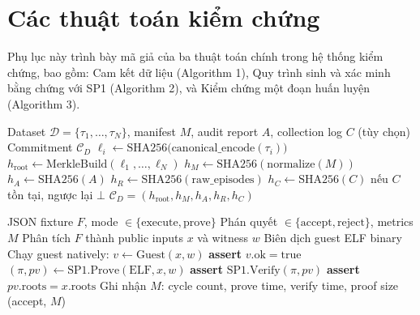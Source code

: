 \documentclass[12pt,a4paper,oneside]{report}
\begin{document}
\chapter{Các thuật toán kiểm chứng}

Phụ lục này trình bày mã giả của ba thuật toán chính trong hệ thống kiểm chứng, bao gồm: Cam kết dữ liệu (Algorithm 1), Quy trình sinh và xác minh bằng chứng với SP1 (Algorithm 2), và Kiểm chứng một đoạn huấn luyện (Algorithm 3).

\begin{algorithm}[H]
\caption{Cam kết dữ liệu replay có ràng buộc (Provenance-Bound Dataset Commitment)}
\label{alg:dataset-commitment}
\begin{algorithmic}[1]
\Require Dataset $\mathcal{D} = \{\tau_1, \ldots, \tau_N\}$, manifest $M$,
  audit report $A$, collection log $C$ (tùy chọn)
\Ensure Commitment $\mathcal{C}_D$
  \State $\ell_i \gets \text{SHA256}\bigl(\text{canonical\_encode}(\tau_i)\bigr)$
\EndFor
\State $h_{\text{root}} \gets \text{MerkleBuild}(\ell_1, \ldots, \ell_N)$
\State $h_M \gets \text{SHA256}(\text{normalize}(M))$
\State $h_A \gets \text{SHA256}(A)$
\State $h_R \gets \text{SHA256}(\text{raw\_episodes})$
\State $h_C \gets \text{SHA256}(C)$ nếu $C$ tồn tại, ngược lại $\bot$
\State \Return $\mathcal{C}_D = (h_{\text{root}}, h_M, h_A, h_R, h_C)$
\end{algorithmic}
\end{algorithm}

\vspace{1cm}

\begin{algorithm}[H]
\caption{Quy trình sinh/xác minh proof với SP1 (SP1 Relation Prove/Verify Workflow)}
\label{alg:sp1-workflow}
\begin{algorithmic}[1]
\Require JSON fixture $F$, mode $\in \{\text{execute}, \text{prove}\}$
\Ensure Phán quyết $\in \{\text{accept}, \text{reject}\}$, metrics $M$
\State Phân tích $F$ thành public inputs $x$ và witness $w$
\State Biên dịch guest ELF binary
  \State Chạy guest natively: $v \gets \text{Guest}(x, w)$
  \State \textbf{assert} $v.\text{ok} = \text{true}$
  \State $(\pi, \mathit{pv}) \gets \text{SP1.Prove}(\text{ELF}, x, w)$
  \State \textbf{assert} $\text{SP1.Verify}(\pi, \mathit{pv})$
  \State \textbf{assert} $\mathit{pv}.\text{roots} = x.\text{roots}$
  \State Ghi nhận $M$: cycle count, prove time, verify time, proof size
\EndIf
\State \Return (accept, $M$)
\end{algorithmic}
\end{algorithm}
\end{document}
